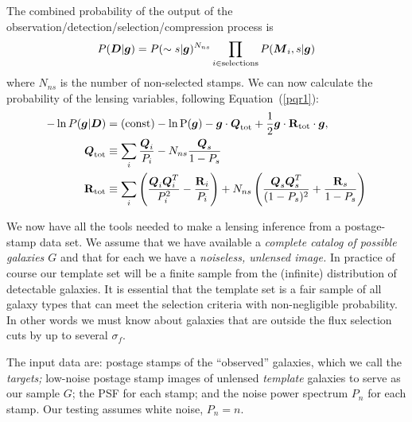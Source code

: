 \documentclass[11pt,preprint,flushrt]{aastex}
\def\eqq#1{Equation~(\ref{#1})}
\newcommand{\vecD}{\mbox{\boldmath $D$}}
\newcommand{\vecg}{\mbox{\boldmath $g$}}
\newcommand{\vecM}{\mbox{\boldmath $M$}}
\newcommand{\vecQ}{\mbox{\boldmath $Q$}}
\newcommand{\matR}{\mbox{$\bf R$}}
\begin{document}
The combined probability of the output of the
observation/detection/selection/compression process is
\begin{equation}
P(\vecD | \vecg) = P(\sim s | \vecg)^{N_{ns}} \prod_{i\in{\rm
    selections}} P(\vecM_i,s | \vecg) 
\end{equation}
where $N_{ns}$ is the number of non-selected stamps.  We can now
calculate the probability of the lensing variables, following \eqq{pqr1}:
\begin{align}
\label{pqr2}
-\ln P(\vecg | \vecD) & = (\rm const) - \ln P(\vecg) - \vecg \cdot \vecQ_{\rm tot}
+ \frac{1}{2} \vecg \cdot \matR_{\rm tot}
   \cdot \vecg, \\
\label{qtot2}
\vecQ_{\rm tot} & \equiv \sum_i   \frac{\vecQ_i}{P_i}  -
                  N_{ns}\frac{\vecQ_s}{1-P_s} \\
\label{rtot2}
\matR_{\rm tot} & \equiv \sum_i \left(
   \frac{\vecQ_i\vecQ_i^T}{P_i^2} - \frac{\matR_i}{P_i}\right) +
                  N_{ns}\left( \frac{\vecQ_s\vecQ_s^T}{(1-P_s)^2} + \frac{\matR_s}{1-P_s}\right)
\end{align}

We now have all the tools needed to make a lensing inference from a
postage-stamp data set.  We assume that we have available a
\emph{complete catalog of possible galaxies $G$} and that for each we
have a \emph{noiseless, unlensed image.}  In practice
of course our template set will be a finite sample from the (infinite)
distribution of detectable galaxies.  It is essential that the template
set is a fair sample of all galaxy types that can meet the selection
criteria with non-negligible probability.
In other words we must know about galaxies that are outside
the flux selection cuts by up to several $\sigma_f$.

The input data are: postage stamps of the
``observed'' galaxies, which we call the \emph{targets;}
low-noise postage stamp images of unlensed \emph{template}
galaxies to serve as our sample $G$; the PSF for each stamp; and
the noise power spectrum $P_n$ for each stamp.  Our testing assumes
white noise, $P_n=n.$
\end{document}
